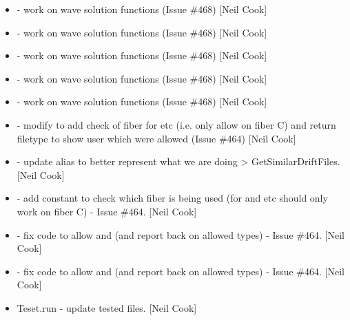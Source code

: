 \documentclass[a4paper,10pt,english]{report}
\begin{document}
\begin{itemize}
\item {} 
 - work on wave solution functions (Issue
\#468) {[}Neil Cook{]}

\item {} 
 - work on wave solution functions (Issue \#468) {[}Neil
Cook{]}

\item {} 
 - work on wave solution functions (Issue \#468)
{[}Neil Cook{]}

\item {} 
 - work on wave solution functions (Issue
\#468) {[}Neil Cook{]}

\item {} 
 - work on wave solution functions (Issue
\#468) {[}Neil Cook{]}

\item {} 
 - modify  to add check of fiber
for   etc (i.e. only allow on fiber C) and return
filetype to show user which  were allowed (Issue \#464) {[}Neil
Cook{]}

\item {} 
 - update alias to better represent what we are
doing  \textendash{}\textgreater{} GetSimilarDriftFiles. {[}Neil Cook{]}

\item {} 
 - add constant to check which fiber is being
used (for  and  etc should only work on fiber C)  -
Issue \#464. {[}Neil Cook{]}

\item {} 
 - fix code to allow  and  (and
report back on allowed types) - Issue \#464. {[}Neil Cook{]}

\item {} 
 - fix code to allow  and  (and
report back on allowed types) - Issue \#464. {[}Neil Cook{]}

\item {} 
Teset.run - update tested files. {[}Neil Cook{]}


\end{itemize}
\end{document}
